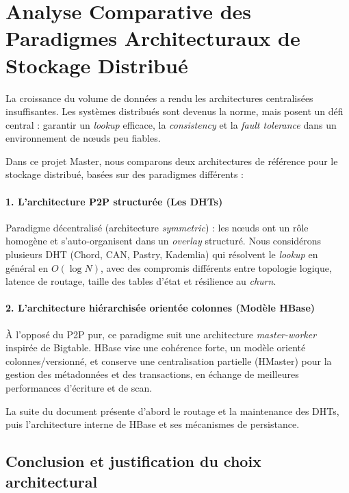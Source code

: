 \section{Analyse Comparative des Paradigmes Architecturaux de Stockage Distribu\'e}

\setlength{\parskip}{3pt}

La croissance du volume de donn\'ees a rendu les architectures centralis\'ees insuffisantes. Les syst\`emes distribu\'es sont devenus la norme, mais posent un d\'efi central : garantir un \emph{lookup} efficace, la \emph{consistency} et la \emph{fault tolerance} dans un environnement de n\oe uds peu fiables.

Dans ce projet Master, nous comparons deux architectures de r\'ef\'erence pour le stockage distribu\'e, bas\'ees sur des paradigmes diff\'erents :

\paragraph{1. L'architecture P2P structur\'ee (Les DHTs)}
Paradigme d\'ecentralis\'e (architecture \emph{symmetric}) : les n\oe uds ont un r\^ole homog\`ene et s'auto-organisent dans un \emph{overlay} structur\'e. Nous consid\'erons plusieurs DHT (Chord, CAN, Pastry, Kademlia) qui r\'esolvent le \emph{lookup} en g\'en\'eral en $O(\log N)$, avec des compromis diff\'erents entre topologie logique, latence de routage, taille des tables d'\'etat et r\'esilience au \emph{churn}.

\paragraph{2. L'architecture hi\'erarchis\'ee orient\'ee colonnes (Mod\`ele HBase)}
\`A l'oppos\'e du P2P pur, ce paradigme suit une architecture \emph{master-worker} inspir\'ee de Bigtable. HBase vise une coh\'erence forte, un mod\`ele orient\'e colonnes/versionn\'e, et conserve une centralisation partielle (HMaster) pour la gestion des m\'etadonn\'ees et des transactions, en \'echange de meilleures performances d'\'ecriture et de scan.

La suite du document pr\'esente d'abord le routage et la maintenance des DHTs, puis l'architecture interne de HBase et ses m\'ecanismes de persistance.



\newpage


\subsection{Conclusion et justification du choix architectural}

